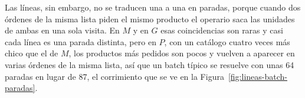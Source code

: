 Las líneas, sin embargo, no se traducen una a una en paradas, porque cuando dos órdenes de la misma lista piden el mismo producto el operario saca las unidades de ambas en una sola visita.
En $M$ y en $G$ esas coincidencias son raras y casi cada línea es una parada distinta, pero en $P$, con un catálogo cuatro veces más chico que el de $M$, los productos más pedidos son pocos y vuelven a aparecer en varias órdenes de la misma lista, así que un batch típico se resuelve con unas 64 paradas en lugar de 87, el corrimiento que se ve en la Figura~\ref{fig:lineas-batch-paradas}.

